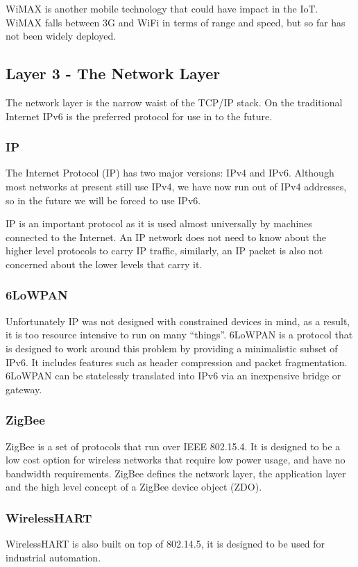 \documentclass[10pt,journal,compsoc]{IEEEtran}
\begin{document}
WiMAX is another mobile technology that could have impact in the IoT. WiMAX
falls between 3G and WiFi in terms of range and speed, but so far has not
been widely deployed.  

\subsection{Layer 3 - The Network Layer}
The network layer is the narrow waist of the TCP/IP stack. On the traditional
Internet IPv6 is the preferred protocol for use in to the future.

\subsubsection{IP}
The Internet Protocol (IP) has two major versions: IPv4 and IPv6. Although most
networks at present still use IPv4, we have now run out of IPv4 addresses, so
in the future we will be forced to use IPv6.

IP is an important protocol as it is used almost universally by machines
connected to the Internet. An IP network does not need to know about the higher
level protocols to carry IP traffic, similarly, an IP packet is also not
concerned about the lower levels that carry it. 

\subsubsection{6LoWPAN}
Unfortunately IP was not designed with constrained devices in mind, as a
result, it is too resource intensive to run on many ``things''. 6LoWPAN is a
protocol that is designed to work around this problem by providing a
minimalistic subset of IPv6. It includes features such as header compression
and packet fragmentation. 6LoWPAN can be statelessly translated into IPv6 via
an inexpensive bridge or gateway. 

\subsubsection{ZigBee}
ZigBee is a set of protocols that run over IEEE 802.15.4. It is designed to be a
low cost option for wireless networks that require low power usage, and have no
bandwidth requirements. ZigBee defines the network layer, the application layer
and the high level concept of a ZigBee device object (ZDO). 

\subsubsection{WirelessHART}
WirelessHART is also built on top of 802.14.5, it is designed to be used for
industrial automation. 
\end{document}
